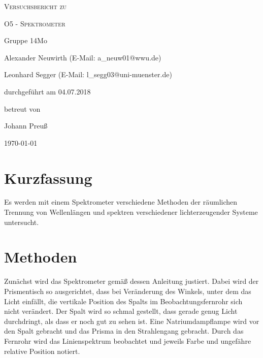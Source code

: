 \documentclass[
	a4paper,
	12pt,
	pagesize,
	ngerman
]{scrartcl}
\begin{document}
	
	\begin{titlepage}
		\centering
		{\scshape\LARGE Versuchsbericht zu \par}
		\vspace{1cm}
		{\scshape\huge O5 - Spektrometer \par}
		\vspace{2.5cm}
		{\LARGE Gruppe 14Mo \par}
		\vspace{0.5cm}
		
		{\large Alexander Neuwirth (E-Mail: a\_neuw01@wwu.de) \par}
		{\large Leonhard Segger (E-Mail: l\_segg03@uni-muenster.de) \par}
		\vfill
		
		durchgeführt am 04.07.2018\par
		betreut von\par
		{\large Johann Preuß} 
		
		\vfill
		
		{\large \today\par}
	\end{titlepage}
	\tableofcontents
	\newpage

	\section{Kurzfassung}
	Es werden mit einem Spektrometer verschiedene Methoden der räumlichen Trennung von Wellenlängen und spektren verschiedener lichterzeugender Systeme untersucht.
	
	\section{Methoden}
	
	Zunächst wird das Spektrometer gemäß dessen Anleitung justiert.
	Dabei wird der Prismentisch so ausgerichtet, dass bei Veränderung des Winkels, unter dem das Licht einfällt, die vertikale Position des Spalts im Beobachtungsfernrohr sich nicht verändert.
	Der Spalt wird so schmal gestellt, dass gerade genug Licht durchdringt, als dass er noch gut zu sehen ist.
	Eine Natriumdampflampe wird vor den Spalt gebracht und das Prisma in den Strahlengang gebracht.%
	Durch das Fernrohr wird das Linienspektrum beobachtet und jeweils Farbe und ungefähre relative Position notiert.
	
\end{document}
